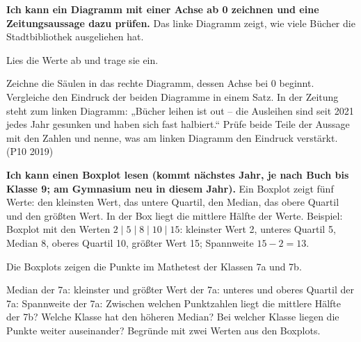 \begin{aufgabe}{\textbf{Ich kann ein Diagramm mit einer Achse ab 0 zeichnen und eine Zeitungsaussage dazu prüfen.} Das linke Diagramm zeigt, wie viele Bücher die Stadtbibliothek ausgeliehen hat.}

\noindent\begin{minipage}[t]{0.48\linewidth}
\end{minipage}\hfill
\begin{minipage}[t]{0.48\linewidth}
\end{minipage}

\begin{teile}
\teil Lies die Werte ab und trage sie ein.
\end{teile}
\begin{teile}
\teil Zeichne die Säulen in das rechte Diagramm, dessen Achse bei 0 beginnt.
\teil Vergleiche den Eindruck der beiden Diagramme in einem Satz.
\teil In der Zeitung steht zum linken Diagramm: „Bücher leihen ist out – die Ausleihen sind seit 2021 jedes Jahr gesunken und haben sich fast halbiert.“ Prüfe beide Teile der Aussage mit den Zahlen und nenne, was am linken Diagramm den Eindruck verstärkt. (P10 2019)
\end{teile}
\end{aufgabe}

\begin{aufgabe}{\textbf{Ich kann einen Boxplot lesen (kommt nächstes Jahr, je nach Buch bis Klasse 9; am Gymnasium neu in diesem Jahr).} Ein Boxplot zeigt fünf Werte: den kleinsten Wert, das untere Quartil, den Median, das obere Quartil und den größten Wert. In der Box liegt die mittlere Hälfte der Werte.}
Beispiel: Boxplot mit den Werten $2 \mid 5 \mid 8 \mid 10 \mid 15$: kleinster Wert 2, unteres Quartil 5, Median 8, oberes Quartil 10, größter Wert 15; Spannweite $15 - 2 = 13$.

Die Boxplots zeigen die Punkte im Mathetest der Klassen 7a und 7b.

\begin{boxplots}[xmin=0,xmax=24,xstep=1,xlabel=Punkte]
\end{boxplots}

\begin{teile}
\teil Median der 7a: \leerfeld
\teil kleinster und größter Wert der 7a: \leerfeld \quad \leerfeld
\teil unteres und oberes Quartil der 7a: \leerfeld \quad \leerfeld
\teil Spannweite der 7a: \leerfeld
\teil Zwischen welchen Punktzahlen liegt die mittlere Hälfte der 7b? \leerfeld
\teil Welche Klasse hat den höheren Median? Bei welcher Klasse liegen die Punkte weiter auseinander? Begründe mit zwei Werten aus den Boxplots.
\end{teile}
\end{aufgabe}

